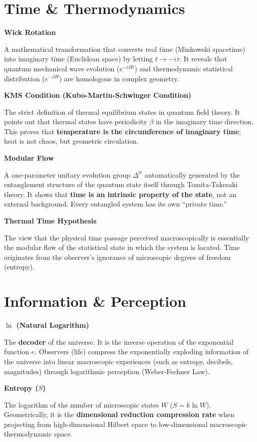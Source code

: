 \documentclass[11pt,a4paper,twoside]{book}
\begin{document}
\section{Time \& Thermodynamics}

\textbf{Wick Rotation}

A mathematical transformation that converts real time (Minkowski spacetime) into imaginary time (Euclidean space) by letting $t \to -i\tau$. It reveals that quantum mechanical wave evolution ($e^{-iHt}$) and thermodynamic statistical distribution ($e^{-\beta H}$) are homologous in complex geometry.

\textbf{KMS Condition (Kubo-Martin-Schwinger Condition)}

The strict definition of thermal equilibrium states in quantum field theory. It points out that thermal states have periodicity $\beta$ in the imaginary time direction. This proves that \textbf{temperature is the circumference of imaginary time}; heat is not chaos, but geometric circulation.

\textbf{Modular Flow}

A one-parameter unitary evolution group $\Delta^{it}$ automatically generated by the entanglement structure of the quantum state itself through Tomita-Takesaki theory. It shows that \textbf{time is an intrinsic property of the state}, not an external background. Every entangled system has its own ``private time.''

\textbf{Thermal Time Hypothesis}

The view that the physical time passage perceived macroscopically is essentially the modular flow of the statistical state in which the system is located. Time originates from the observer's ignorance of microscopic degrees of freedom (entropy).

\section{Information \& Perception}

\textbf{$\ln$ (Natural Logarithm)}

The \textbf{decoder} of the universe. It is the inverse operation of the exponential function $e$. Observers (life) compress the exponentially exploding information of the universe into linear macroscopic experiences (such as entropy, decibels, magnitudes) through logarithmic perception (Weber-Fechner Law).

\textbf{Entropy ($S$)}

The logarithm of the number of microscopic states $W$ ($S = k \ln W$). Geometrically, it is the \textbf{dimensional reduction compression rate} when projecting from high-dimensional Hilbert space to low-dimensional macroscopic thermodynamic space.
\end{document}
